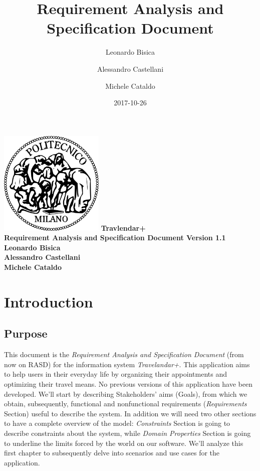 \documentclass[12pt, a4paper]{article}
\title{Requirement Analysis and Specification Document}
\date{2017-10-26}
\author{
	Leonardo Bisica
	\and
	Alessandro Castellani
	\and
	Michele Cataldo
}
\begin{document}
	\begin{titlepage}
		\centering
		\includegraphics[width=5cm]{img/polimi_logo}
		\vfill
		{\bfseries\Large
			Travlendar+\\
			Requirement Analysis and Specification Document
			Version 1.1\\
			\vskip4cm
			Leonardo Bisica\\
			Alessandro Castellani\\
			Michele Cataldo\\
		}
		\vfill
		\vfill
	\end{titlepage}

	\tableofcontents
	
	
	
	\newpage
	\section{Introduction}
		\subsection{Purpose}
		
		This document is the \textit{Requirement Analysis and Specification Document} (from now on RASD) for the information system \textit{Travelandar+}.
		This application aims to help users in their everyday life by organizing their appointments and optimizing their travel means.
		No previous versions of this application have been developed. 
		We’ll start by describing Stakeholders’ aims (Goals), from which we obtain, subsequently, functional and nonfunctional requirements (\textit{Requirements} Section) useful to describe the system.
		In addition we will need two other sections to have a complete overview of the model: \textit{Constraints} Section is going to describe constraints about the system, while \textit{Domain Properties} Section is going to underline the limits forced by the world on our software.
		We'll analyze this first chapter to subsequently delve into scenarios and use cases for the application.
		
\end{document}
